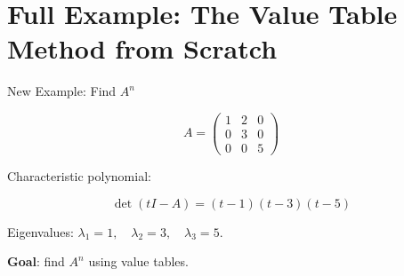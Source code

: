 \documentclass[10pt]{beamer}
\theoremstyle{definition}
\newcommand{\x}[1]{\alert{\textbf{#1}}}
\begin{document}
\section{Full Example: The Value Table Method from Scratch}


%
\begin{frame}{New Example: Find $A^n$}

$$A = \begin{pmatrix} 1 & 2 & 0 \\ 0 & 3 & 0 \\ 0 & 0 & 5 \end{pmatrix}$$

\vfill

Characteristic polynomial:

$$\det(tI - A) = (t - 1)(t - 3)(t - 5)$$

\vfill

Eigenvalues: $\lambda_1 = 1, \quad \lambda_2 = 3, \quad \lambda_3 = 5$.

\vfill\pause

\x{Goal}: find $A^n$ using value tables.

\end{frame}
\end{document}
